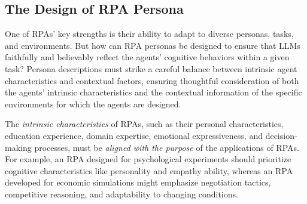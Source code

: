 \subsection{The Design of RPA Persona}

One of RPAs' key strengths is their ability to adapt to diverse personas, tasks, and environments. But how can RPA personas be designed to ensure that LLMs faithfully and believably reflect the agents' cognitive behaviors within a given task?
Persona descriptions must strike a careful balance between intrinsic agent characteristics and contextual factors, ensuring thoughtful consideration of both the agents' intrinsic characteristics and the contextual information of the specific environments for which the agents are designed. 





The \textit{intrinsic characteristics} of RPAs, such as their personal characteristics, education experience, domain expertise, emotional expressiveness, and decision-making processes, must be \textit{aligned with the purpose} of the applications of RPAs.
For example, an RPA designed for psychological experiments should prioritize cognitive characteristics like personality and empathy ability, whereas an RPA developed for economic simulations might emphasize negotiation tactics, competitive reasoning, and adaptability to changing conditions.



